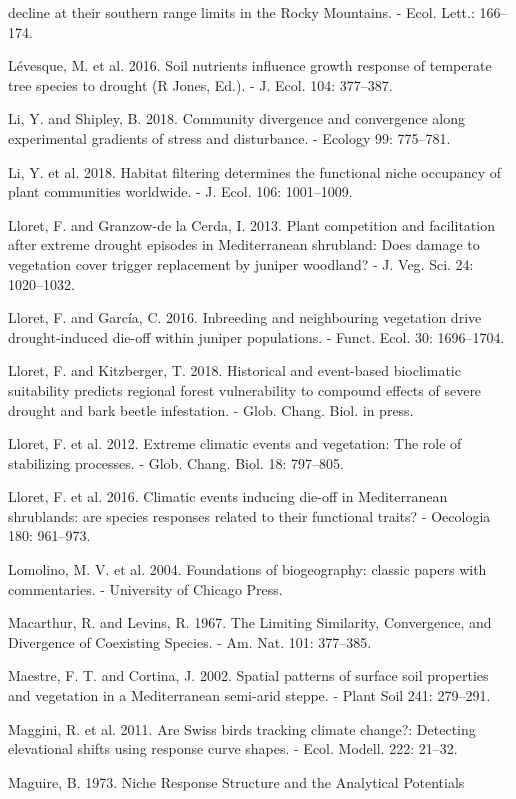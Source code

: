 \documentclass[11pt,twoside]{reedthesis}
\begin{document}
decline at their southern range limits in the Rocky Mountains. - Ecol.
Lett.: 166--174.\par
Lévesque, M. et al. 2016. Soil nutrients influence growth response of
temperate tree species to drought (R Jones, Ed.). - J. Ecol. 104:
377--387.\par
Li, Y. and Shipley, B. 2018. Community divergence and convergence along
experimental gradients of stress and disturbance. - Ecology 99:
775--781.\par
Li, Y. et al. 2018. Habitat filtering determines the functional niche
occupancy of plant communities worldwide. - J. Ecol. 106:
1001--1009.\par
Lloret, F. and Granzow-de la Cerda, I. 2013. Plant competition and
facilitation after extreme drought episodes in Mediterranean shrubland:
Does damage to vegetation cover trigger replacement by juniper woodland?
- J. Veg. Sci. 24: 1020--1032.\par
Lloret, F. and García, C. 2016. Inbreeding and neighbouring vegetation
drive drought-induced die-off within juniper populations. - Funct. Ecol.
30: 1696--1704.\par
Lloret, F. and Kitzberger, T. 2018. Historical and event-based
bioclimatic suitability predicts regional forest vulnerability to
compound effects of severe drought and bark beetle infestation. - Glob.
Chang. Biol. in press.\par
Lloret, F. et al. 2012. Extreme climatic events and vegetation: The role
of stabilizing processes. - Glob. Chang. Biol. 18: 797--805.\par
Lloret, F. et al. 2016. Climatic events inducing die-off in
Mediterranean shrublands: are species responses related to their
functional traits? - Oecologia 180: 961--973.\par
Lomolino, M. V. et al. 2004. Foundations of biogeography: classic papers
with commentaries. - University of Chicago Press.\par
Macarthur, R. and Levins, R. 1967. The Limiting Similarity, Convergence,
and Divergence of Coexisting Species. - Am. Nat. 101: 377--385.\par
Maestre, F. T. and Cortina, J. 2002. Spatial patterns of surface soil
properties and vegetation in a Mediterranean semi-arid steppe. - Plant
Soil 241: 279--291.\par
Maggini, R. et al. 2011. Are Swiss birds tracking climate change?:
Detecting elevational shifts using response curve shapes. - Ecol.
Modell. 222: 21--32.\par
Maguire, B. 1973. Niche Response Structure and the Analytical Potentials
\end{document}
